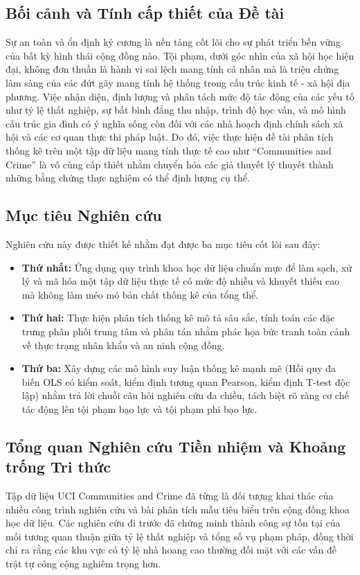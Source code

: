 \documentclass[conference]{IEEEtran}
\begin{document}
\subsection{Bối cảnh và Tính cấp thiết của Đề tài}
Sự an toàn và ổn định kỷ cương là nền tảng cốt lõi cho sự phát triển bền vững của bất kỳ hình thái cộng đồng nào. Tội phạm, dưới góc nhìn của xã hội học hiện đại, không đơn thuần là hành vi sai lệch mang tính cá nhân mà là triệu chứng lâm sàng của các đứt gãy mang tính hệ thống trong cấu trúc kinh tế - xã hội địa phương. Việc nhận diện, định lượng và phân tách mức độ tác động của các yếu tố như tỷ lệ thất nghiệp, sự bất bình đẳng thu nhập, trình độ học vấn, và mô hình cấu trúc gia đình có ý nghĩa sống còn đối với các nhà hoạch định chính sách xã hội và các cơ quan thực thi pháp luật. Do đó, việc thực hiện đề tài phân tích thống kê trên một tập dữ liệu mang tính thực tế cao như ``Communities and Crime'' là vô cùng cấp thiết nhằm chuyển hóa các giả thuyết lý thuyết thành những bằng chứng thực nghiệm có thể định lượng cụ thể.

\subsection{Mục tiêu Nghiên cứu}
Nghiên cứu này được thiết kế nhằm đạt được ba mục tiêu cốt lõi sau đây:
\begin{itemize}
    \item \textbf{Thứ nhất:} Ứng dụng quy trình khoa học dữ liệu chuẩn mực để làm sạch, xử lý và mã hóa một tập dữ liệu thực tế có mức độ nhiễu và khuyết thiếu cao mà không làm méo mó bản chất thống kê của tổng thể.
    \item \textbf{Thứ hai:} Thực hiện phân tích thống kê mô tả sâu sắc, tính toán các đặc trưng phân phối trung tâm và phân tán nhằm phác họa bức tranh toàn cảnh về thực trạng nhân khẩu và an ninh cộng đồng.
    \item \textbf{Thứ ba:} Xây dựng các mô hình suy luận thống kê mạnh mẽ (Hồi quy đa biến OLS có kiểm soát, kiểm định tương quan Pearson, kiểm định T-test độc lập) nhằm trả lời chuỗi câu hỏi nghiên cứu đa chiều, tách biệt rõ ràng cơ chế tác động lên tội phạm bạo lực và tội phạm phi bạo lực.
\end{itemize}

\subsection{Tổng quan Nghiên cứu Tiền nhiệm và Khoảng trống Tri thức}
Tập dữ liệu UCI Communities and Crime đã từng là đối tượng khai thác của nhiều công trình nghiên cứu và bài phân tích mẫu tiêu biểu trên cộng đồng khoa học dữ liệu. Các nghiên cứu đi trước đã chứng minh thành công sự tồn tại của mối tương quan thuận giữa tỷ lệ thất nghiệp và tổng số vụ phạm pháp, đồng thời chỉ ra rằng các khu vực có tỷ lệ nhà hoang cao thường đối mặt với các vấn đề trật tự công cộng nghiêm trọng hơn.
\end{document}
